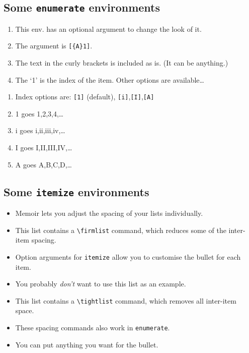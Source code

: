 \documentclass[12pt,article]{memoir}
\begin{document}
\subsection*{Some \texttt{enumerate} environments}
\tightlists
\begin{enumerate}[{A}1]
	\item This env. has an optional argument to change the look of it.
	\item The argument is \verb|[{A}1]|.
	\item The text in the curly brackets is included as is. (It can be anything.)
	\item The `1' is the index of the item. Other options are available\dots
\end{enumerate}

\begin{enumerate}[\scshape i]
	\item Index options are: \texttt{[1]} (default), \texttt{[i]},\texttt{[I]},\texttt{[A]}
	\item 1 goes 1,2,3,4,\dots
	\item i goes i,ii,iii,iv,\dots
	\item I goes I,II,III,IV,\dots
	\item A goes A,B,C,D,\dots
\end{enumerate}


\subsection*{Some \texttt{itemize} environments}

\begin{itemize}
	\firmlist
	\item \textsf{Memoir} lets you adjust the spacing of your lists individually.
	\item This list contains a \verb|\firmlist| command, which reduces some of the inter-item spacing.
\end{itemize}

\begin{itemize}[\S]
	\item Option arguments for \texttt{itemize} allow you to customise the bullet for each item.
	\item You probably \emph{don't} want to use this list as an example.
\end{itemize}

\begin{itemize}[\$]
\tightlist
	\item This list contains a \verb|\tightlist| command, which removes all inter-item space.
	\item These spacing commands also work in \texttt{enumerate}.
	\item You can put anything you want for the bullet.
\end{itemize}
\end{document}
